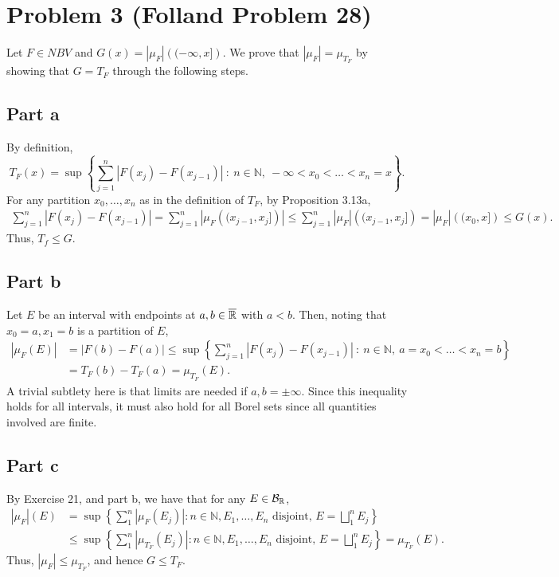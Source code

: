\documentclass{article}
\begin{document}
\section{Problem 3 (Folland Problem 28)}
Let $F\in NBV$ and $G(x)=\left|\mu_F\right|\left((-\infty,x]\right)$. We prove that $\left|\mu_F\right|=\mu_{T_F}$ by showing that $G=T_F$ through the following steps.
\subsection{Part a}
By definition,
\[
T_F(x)=\sup\left\{\sum_{j=1}^{n}\left|F(x_j)-F(x_{j-1})\right|~:~n\in\mathbb{N},~-\infty<x_0<\ldots<x_n=x\right\}.
\]
For any partition $x_0,\ldots,x_n$ as in the definition of $T_F$, by Proposition 3.13a,
\begin{align*}
\sum_{j=1}^{n}\left|F(x_j)-F(x_{j-1})\right|=\sum_{j=1}^{n}\left|\mu_F\left((x_{j-1},x_j]\right)\right|\leq\sum_{j=1}^{n}\left|\mu_F\right|\left((x_{j-1},x_j]\right)=\left|\mu_F\right|\left((x_{0},x]\right)\leq G(x).
\end{align*}
Thus, $T_f\leq G$.
\subsection{Part b}
Let $E$ be an interval with endpoints at $a,b\in\overline{\mathbb{R}}$ with $a<b$. Then, noting that $x_0=a,x_1=b$ is a partition of $E$, 
\begin{align*}
\left|\mu_F(E)\right|&=|F(b)-F(a)|\leq\sup\left\{\sum_{j=1}^{n}\left|F(x_j)-F(x_{j-1})\right|~:~n\in\mathbb{N},~a=x_0<\ldots<x_n=b\right\}\\&=
T_F(b)-T_F(a)=\mu_{T_F}(E).
\end{align*}
A trivial subtlety here is that limits are needed if $a,b=\pm\infty$. Since this inequality holds for all intervals, it must also hold for all Borel sets since all quantities involved are finite.
\subsection{Part c}
By Exercise 21, and part b, we have that for any $E\in{\cal B}_{\mathbb{R}}$,
\begin{align*}
\left|\mu_F\right|(E)&=\sup \left\{\sum_1^n\left|\mu_F\left(E_j\right)\right|: n \in \mathbb{N}, E_1, \ldots, E_n \text { disjoint, } E=\bigsqcup_1^n E_j\right\}\\&\leq
\sup\left\{\sum_1^n\left|\mu_{T_F}\left(E_j\right)\right|: n \in \mathbb{N}, E_1, \ldots, E_n \text { disjoint, } E=\bigsqcup_1^n E_j\right\} =\mu_{T_F}(E).
\end{align*}
Thus, $\left|\mu_F\right|\leq\mu_{T_F}$, and hence $G\leq T_F$.
\end{document}
